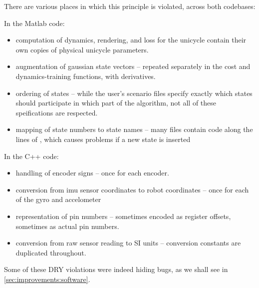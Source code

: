 \documentclass[main.tex]{subfiles}
\begin{document}
	There are various places in which this principle is violated, across both codebases:
	\begin{multicols}{2}
		\raggedcolumns
		\noindent
		In the Matlab code:

		\begin{itemize}[noitemsep]
			\item computation of dynamics, rendering, and loss for the unicycle contain their own copies of physical unicycle parameters.
			\item augmentation of gaussian state vectors -- repeated separately in the cost and dynamics-training functions, with derivatives.
			\item ordering of states -- while the user's scenario files specify exactly which states should participate in which part of the algorithm, not all of these speifications are respected.
			\item mapping of state numbers to state names -- many files contain code along the lines of , which causes problems if a new state is inserted
		\end{itemize}

		\columnbreak

		\noindent
		In the C++ code:

		\begin{itemize}[noitemsep]
			\item handling of encoder signs -- once for each encoder.
			\item conversion from imu sensor coordinates to robot coordinates -- once for each of the gyro and accelometer
			\item representation of pin numbers -- sometimes encoded as register offsets, sometimes as actual pin numbers.
			\item conversion from raw sensor reading to SI units -- conversion constants are duplicated throughout.
		\end{itemize}
	\end{multicols}
	Some of these DRY violations were indeed hiding bugs, as we shall see in \cref{sec:improvements:software}.
\end{document}
